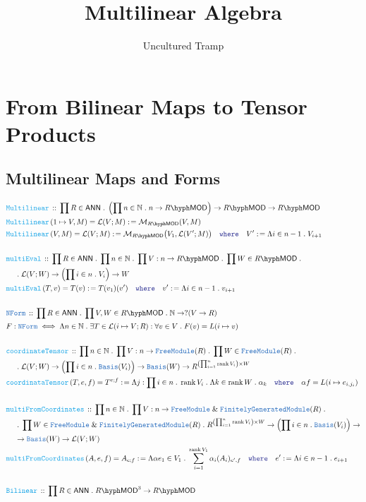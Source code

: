 \documentclass[12pt]{scrartcl}%
\title{Multilinear Algebra}
\author{Uncultured Tramp}
\newcommand{\TYPE}[1]{\textcolor{NavyBlue}{\mathtt{#1}}}%
\newcommand{\FUNC}[1]{\textcolor{Cerulean}{\mathtt{#1}}}%
\newcommand{\LOGIC}[1]{\textcolor{Blue}{\mathtt{#1}}}%
\renewcommand{\.}{\; . \;} %
\newcommand{\de}{: \kern 0.1pc =} %
\newcommand{\where}{\LOGIC{where}} %
\newcommand{\Act}[1]{\left( #1 \right)} %
\newcommand{\DeclareType}[2]{& \TYPE{#1} \, :: \, #2 \\}%
\newcommand{\DefineType}[3]{& #1 : \TYPE{#2} \iff #3 \\}%
\newcommand{\DeclareFunc}[2]{& \FUNC{#1} \, :: \, #2 \\}%
\newcommand{\DefineNamedFunc}[4]{&  \FUNC{#1}\Act{#2} = #3 \de #4 \\}%
\newcommand{\NewLine}{\\ & \kern 1pc}%
\newcommand{\Page}[1]{ \begin{align*} #1 \end{align*}  }%
\renewcommand{\And}{\; \& \;}%
\newcommand{\Nat}{\mathbb{N}}%
\newcommand{\Mor}{\mathcal{M}}%
\DeclareMathOperator{\rank}{rank} %
\newcommand{\Basis}{\TYPE{Basis}} %
\newcommand{\FGM}{\TYPE{FinitelyGeneratedModule}}%
\newcommand{\FM}{\TYPE{FreeModule}}
\newcommand{\LMOD}[1]{#1\hyph\mathsf{MOD}} %
\renewcommand{\L}{\mathcal{L}}
\newcommand{\ANN}{\mathsf{ANN}} %
\begin{document}
\maketitle
\normalsize
\newpage
\tableofcontents
\newpage
\section{From Bilinear Maps to Tensor Products}
\subsection{Multilinear Maps and Forms}
\Page{
	\DeclareFunc{Multilinear}{\prod R \in \ANN \. \left(\prod n \in \Nat \. n \to \LMOD{R} \right) \to \LMOD{R} \to \LMOD{R}}
	\DefineNamedFunc{Multilinear}{1 \mapsto V,M}{\L(V;M)}{\Mor_{\LMOD{R}}(V,M)}
	\DefineNamedFunc{Multilinear}{V,M}{\L(V;M)}{\Mor_{\LMOD{R}}\big(V_1,\L(V';M)\big) \quad \where \quad V' \de \Lambda i \in n-1 \. V_{i+1}}
	\\
	\DeclareFunc{multiEval}{\prod R \in \ANN \. \prod n \in \Nat \. \prod V : n \to \LMOD{R} \. \prod W \in \LMOD{R} \. \NewLine \. 
		\L(V;W) \to \left(\prod i \in n \. V_i\right) \to W}
	\DefineNamedFunc{multiEval}{T,v}{T(v)}{T(v_1)(v') \quad \where \quad v' \de \Lambda i \in n-1 \. v_{i+1}}
	\\
	\DeclareType{NForm}{\prod R \in \ANN \. \prod V,W \in \LMOD{R} \. \Nat \to ?(V \to R)}
	\DefineType{F}{NForm}{\Lambda n \in \Nat \. \exists T \in \L(i \mapsto  V ; R) : \forall v \in V \. F(v) = L(i \mapsto v)}
	\\
	\DeclareFunc{coordinateTensor}{\prod n \in \Nat \. \prod V : n \to \FM(R) \. \prod W \in \FM(R) \. \NewLine \.  
		\L(V;W) \to \left( \prod i \in n \. \Basis(V_i)\right) \to \Basis(W)  \to R^{\left(\prod^n_{i=1}\rank V_i\right) \times W} }
	\DefineNamedFunc{coordinataTensor}{T,e,f}{T^{e;f}}
	{\Lambda j : \prod i \in n \. \rank V_i \. \Lambda k \in \rank W \. \alpha_k \quad \where \quad  \alpha f = L(i \mapsto e_{i,j_i}) }
	\\
	\DeclareFunc{multiFromCoordinates}{\prod n \in \Nat \. \prod V : n \to \FM\And \FGM(R) \. \NewLine \. \prod W \in \FM \And \FGM(R)  \.  
		 R^{\left(\prod^n_{i=1}\rank V_i\right) \times W}  \to \left( \prod i \in n \. \Basis(V_i)\right) \to \NewLine \to \Basis(W) \to  \L(V;W)  }
	\DefineNamedFunc{multiFromCoordinates}{A,e,f}{A_{e;f}}
	{\Lambda \alpha e_1  \in V_1 \. \sum^{\rank V_1}_{i=1} \alpha_i (A_i)_{e',f}  \quad \where \quad  e' \de \Lambda i \in n-1 \. e_{i+1} }
	\\
	\DeclareFunc{Bilinear}{\prod R \in \ANN \. \LMOD{R}^3 \to \LMOD{R} }
}
\end{document}
